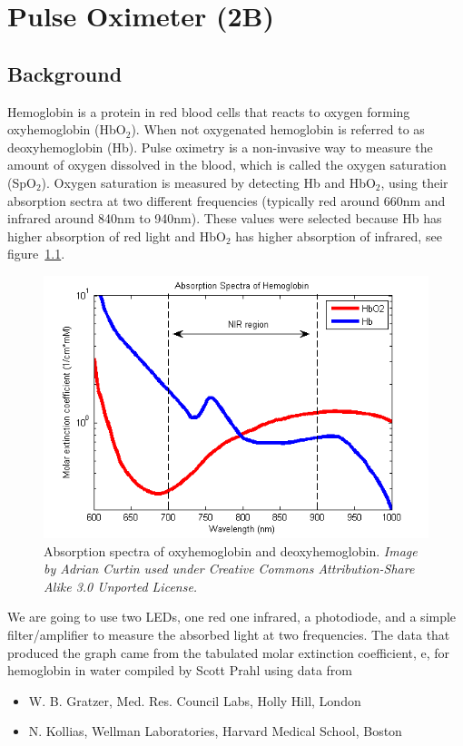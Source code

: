 \chapter{Pulse Oximeter (2B)}

\section{Background}
Hemoglobin is a protein in red blood cells that reacts to oxygen forming oxyhemoglobin (HbO$_2$).  When not oxygenated hemoglobin is referred to as deoxyhemoglobin (Hb).  Pulse oximetry is a non-invasive way to measure the amount of oxygen dissolved in the blood, which is called the oxygen saturation (SpO$_2$). Oxygen saturation is measured by detecting Hb and HbO$_2$, using their absorption sectra at two different frequencies (typically red around 660nm and infrared around 840nm to 940nm).  These values were selected because Hb has higher absorption of red light and HbO$_2$ has higher absorption of infrared, see figure~\ref{fig-spectrum}.

 \begin{figure}
 \caption{Absorption spectra of oxyhemoglobin and deoxyhemoglobin. \emph{Image by Adrian Curtin used under  Creative Commons Attribution-Share Alike 3.0 Unported License.}}
 \label{fig-spectrum}
 \includegraphics{../images/Oxy_and_Deoxy_Hemoglobin_Near-Infrared_absorption_spectra.png}
 \end{figure}

We are going to use two LEDs, one red one infrared, a photodiode, and a simple filter/amplifier to measure the absorbed light at two frequencies.  The data that produced the graph came from the tabulated molar extinction coefficient, e, for hemoglobin in water compiled by Scott Prahl using data from
\begin{itemize}
\item W. B. Gratzer, Med. Res. Council Labs, Holly Hill, London
\item N. Kollias, Wellman Laboratories, Harvard Medical School, Boston
\end{itemize}

